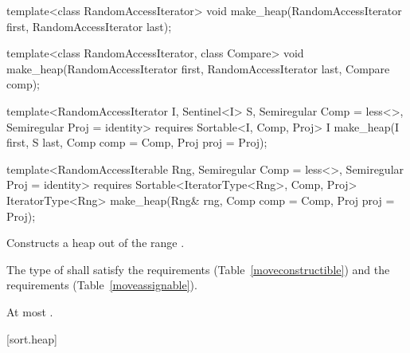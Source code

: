 %
\begin{removedblock}
\begin{itemdecl}
template<class RandomAccessIterator>
  void make_heap(RandomAccessIterator first, RandomAccessIterator last);

template<class RandomAccessIterator, class Compare>
  void make_heap(RandomAccessIterator first, RandomAccessIterator last,
                 Compare comp);
\end{itemdecl}
\end{removedblock}
\begin{addedblock}
\begin{itemdecl}
template<RandomAccessIterator I, Sentinel<I> S, Semiregular Comp = less<>,
    Semiregular Proj = identity>
  requires Sortable<I, Comp, Proj>
  I make_heap(I first, S last, Comp comp = Comp{}, Proj proj = Proj{});

template<RandomAccessIterable Rng, Semiregular Comp = less<>, Semiregular Proj = identity>
  requires Sortable<IteratorType<Rng>, Comp, Proj>
  IteratorType<Rng>
    make_heap(Rng& rng, Comp comp = Comp{}, Proj proj = Proj{});
\end{itemdecl}
\end{addedblock}

\begin{itemdescr}
\pnum
\effects
Constructs a heap out of the range
.

\begin{removedblock}
\pnum
\requires The type of  shall satisfy
the  requirements
(Table~\ref{moveconstructible}) and the
 requirements
(Table~\ref{moveassignable}).
\end{removedblock}

\begin{addedblock}
\pnum
\returns {}
\end{addedblock}

\pnum
\complexity
At most
.
\end{itemdescr}

[sort.heap]{}

